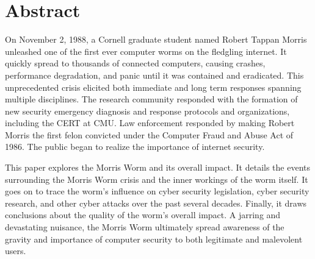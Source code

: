 \section*{Abstract}

On November 2, 1988, a Cornell graduate student named Robert Tappan Morris unleashed one of the first ever computer worms on the fledgling internet. It quickly spread to thousands of connected computers, causing crashes, performance degradation, and panic until it was contained and eradicated. This unprecedented crisis elicited both immediate and long term responses spanning multiple disciplines. The research community responded with the formation of new security emergency diagnosis and response protocols and organizations, including the CERT at CMU. Law enforcement responded by making Robert Morris the first felon convicted under the Computer Fraud and Abuse Act of 1986. The public began to realize the importance of internet security. 

This paper explores the Morris Worm and its overall impact. It details the events surrounding the Morris Worm crisis and the inner workings of the worm itself. It goes on to trace the worm's influence on cyber security legislation, cyber security research, and other cyber attacks over the past several decades. Finally, it draws conclusions about the quality of the worm's overall impact. A jarring and devastating nuisance, the Morris Worm ultimately spread awareness of the gravity and importance of computer security to both legitimate and malevolent users. 